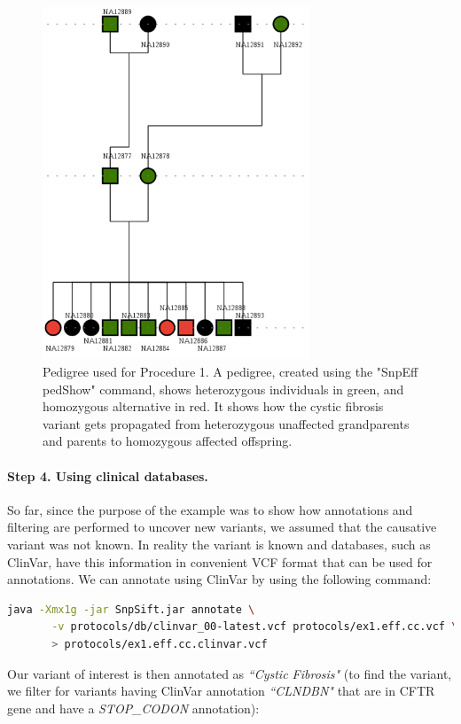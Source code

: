 \begin{figure}
    \centering
    \includegraphics[width=8cm]{snpeff_2.png}
    \caption{Pedigree used for Procedure 1. A pedigree, created using the "SnpEff pedShow" command, shows heterozygous individuals in green, and homozygous alternative in red. It shows how the cystic fibrosis variant gets propagated from heterozygous unaffected grandparents and parents to homozygous affected offspring.}
    \label{fig:snpeff2}
\end{figure}

\paragraph{Step 4. Using clinical databases.} So far, since the purpose of the example was to show how annotations and filtering are performed to uncover new variants, we assumed that the causative variant was not known. In reality the variant is known and databases, such as ClinVar, have this information in convenient VCF format that can be used for annotations. We can annotate using ClinVar by using the following command:

\begin{lstlisting}[language=bash]
java -Xmx1g -jar SnpSift.jar annotate \
       -v protocols/db/clinvar_00-latest.vcf protocols/ex1.eff.cc.vcf \
       > protocols/ex1.eff.cc.clinvar.vcf
\end{lstlisting}

Our variant of interest is then annotated as \textit{``Cystic Fibrosis"} (to find the variant, we filter for variants having ClinVar annotation \textit{``CLNDBN"} that are in CFTR gene and have a \textit{STOP\_CODON} annotation):


